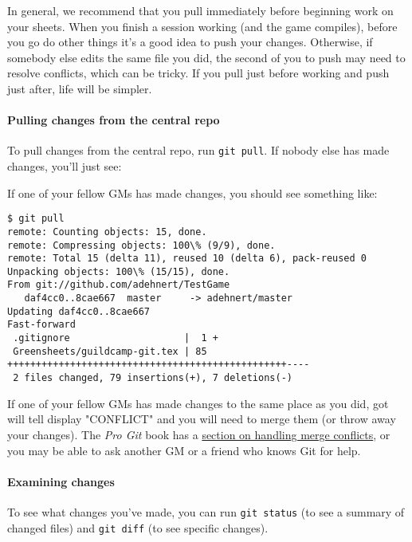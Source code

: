 \documentclass[green]{testgame}
\begin{document}
In general, we recommend that you pull immediately before beginning work on your sheets. When you finish a session working (and the game compiles), before you go do other things it's a good idea to push your changes. Otherwise, if somebody else edits the same file you did, the second of you to push may need to resolve conflicts, which can be tricky. If you pull just before working and push just after, life will be simpler.

\paragraph*{Pulling changes from the central repo}

To pull changes from the central repo, run \texttt{git pull}. If nobody else has made changes, you'll just see:\\

If one of your fellow GMs has made changes, you should see something like:
\begin{verbatim}
$ git pull
remote: Counting objects: 15, done.
remote: Compressing objects: 100\% (9/9), done.
remote: Total 15 (delta 11), reused 10 (delta 6), pack-reused 0
Unpacking objects: 100\% (15/15), done.
From git://github.com/adehnert/TestGame
   daf4cc0..8cae667  master     -> adehnert/master
Updating daf4cc0..8cae667
Fast-forward
 .gitignore                    |  1 +
 Greensheets/guildcamp-git.tex | 85 +++++++++++++++++++++++++++++++++++++++++++++++++----
 2 files changed, 79 insertions(+), 7 deletions(-)
\end{verbatim}

If one of your fellow GMs has made changes to the same place as you did, got will tell display "CONFLICT" and you will need to merge them (or throw away your changes). The \emph{Pro Git} book has a \href{https://git-scm.com/book/en/v2/Git-Branching-Basic-Branching-and-Merging#_basic_merge_conflicts}{section on handling merge conflicts}, or you may be able to ask another GM or a friend who knows Git for help.

\paragraph*{Examining changes}

To see what changes you've made, you can run \texttt{git status} (to see a summary of changed files) and \texttt{git diff} (to see specific changes).
\end{document}
